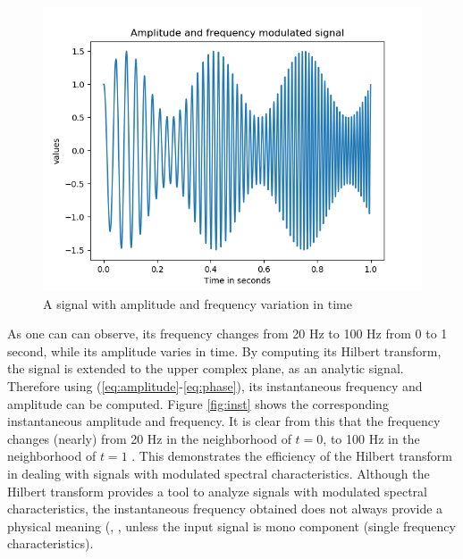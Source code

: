 \documentclass[../Main/thesis.tex]{subfiles}
\begin{document}
\begin{figure}[H]
	\centering
	\includegraphics[width=1\linewidth]{../fig/mode}
	\caption{A signal with amplitude and frequency variation in time}
	\label{fig:mode}
\end{figure}
\justify
As one can can observe, its frequency changes from 20 Hz to 100 Hz from 0 to 1 second, while its amplitude varies in time. By computing its Hilbert transform, the signal is extended to the upper complex plane, as an analytic signal. Therefore using (\ref{eq:amplitude}-\ref{eq:phase}), its instantaneous frequency and amplitude can be computed.
\justify
Figure \ref{fig:inst} shows the corresponding instantaneous amplitude and frequency. It is clear from this that the frequency changes (nearly) from 20 Hz in the neighborhood of $t=0$, to 100 Hz in the neighborhood of $t = 1$ . This demonstrates the efficiency of the Hilbert transform in dealing with signals with modulated spectral characteristics. 
\justify
Although the Hilbert transform provides a tool to analyze signals with modulated spectral characteristics, the instantaneous frequency obtained does not always provide a physical meaning (\cite{huang98}, \cite{huang08}, unless the input signal is mono component (single frequency characteristics).
\end{document}
